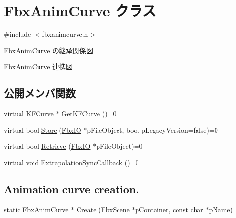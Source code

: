 \hypertarget{class_fbx_anim_curve}{}\section{Fbx\+Anim\+Curve クラス}
\label{class_fbx_anim_curve}


{\ttfamily \#include $<$fbxanimcurve.\+h$>$}



Fbx\+Anim\+Curve の継承関係図


Fbx\+Anim\+Curve 連携図
\subsection*{公開メンバ関数}
\begin{DoxyCompactItemize}
\item 
virtual K\+F\+Curve $\ast$ \hyperlink{class_fbx_anim_curve_a7c7cbe48da39fa57af9f32acc68a0ba5}{Get\+K\+F\+Curve} ()=0
\item 
virtual bool \hyperlink{class_fbx_anim_curve_a0ef3229e43aaca33ab50161235541060}{Store} (\hyperlink{class_fbx_i_o}{Fbx\+IO} $\ast$p\+File\+Object, bool p\+Legacy\+Version=false)=0
\item 
virtual bool \hyperlink{class_fbx_anim_curve_a17087752d3a28d373b2aaa66d1755f62}{Retrieve} (\hyperlink{class_fbx_i_o}{Fbx\+IO} $\ast$p\+File\+Object)=0
\item 
virtual void \hyperlink{class_fbx_anim_curve_a8982eaf744608ac38457fd6f87990044}{Extrapolation\+Sync\+Callback} ()=0
\end{DoxyCompactItemize}
\subsection*{Animation curve creation.}
\begin{DoxyCompactItemize}
\item 
static \hyperlink{class_fbx_anim_curve}{Fbx\+Anim\+Curve} $\ast$ \hyperlink{class_fbx_anim_curve_ab0faf2c8c4a3d0fa8535da4a3eacb74a}{Create} (\hyperlink{class_fbx_scene}{Fbx\+Scene} $\ast$p\+Container, const char $\ast$p\+Name)
\end{DoxyCompactItemize}
